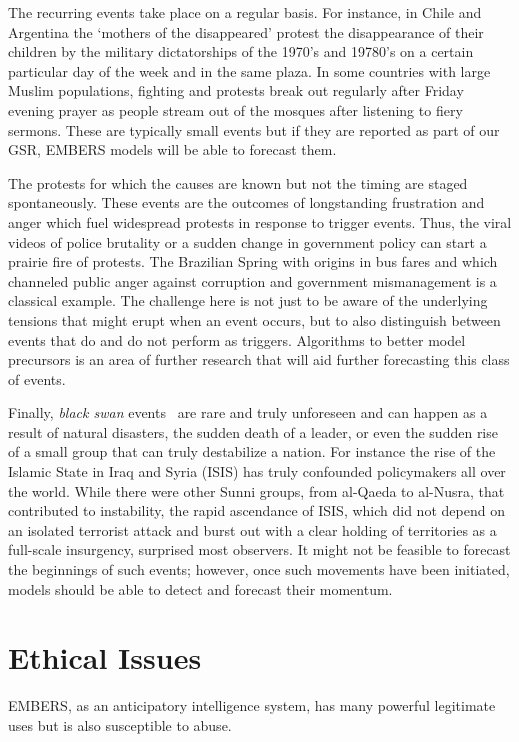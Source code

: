 \documentclass[11pt,a4paper,extrafontsizes,oneside]{article}
\begin{document}
The recurring events take place on a regular basis.  For instance, in Chile and Argentina the
`mothers of the disappeared' protest the disappearance of their children by the military dictatorships
of the 1970's and 19780's on a certain particular day of the week and in the same plaza.
In some countries with large Muslim populations, fighting and protests break out regularly after
Friday evening prayer as people stream out of the mosques after listening
to fiery sermons. These are typically small events but if they are reported as part of our GSR,
EMBERS models will be able to forecast them.

The protests for which the causes are known but not the timing are staged spontaneously.  These
events are the outcomes of longstanding frustration and anger which fuel widespread
protests in response to trigger events.  Thus, the viral videos of police brutality or
a sudden change in government policy can start a prairie fire of protests.  The Brazilian
Spring with origins in bus fares and which channeled
public anger against corruption and government mismanagement is a classical example. The challenge here
is not just to be aware of the underlying tensions that might erupt when an event occurs, but to also
distinguish between events that do and do not perform as triggers. Algorithms to better model
precursors is an area of further research that will aid further forecasting this class of events.

Finally, {\it black swan} events~\cite{taleb-book} are rare and truly unforeseen and can happen as a
result of natural disasters, the sudden death of a leader, or even the sudden rise of a
small group that can truly destabilize a nation.  For instance the rise of the
Islamic State in Iraq and Syria (ISIS) has truly confounded policymakers all over the world.
While there were other Sunni groups, from al-Qaeda to al-Nusra, that contributed to
instability, the rapid ascendance of ISIS, which did not depend on an isolated terrorist attack and
burst out with a clear holding of territories as a full-scale insurgency, surprised most observers.
It might not be feasible to forecast the beginnings of such events; however, once such movements
have been initiated, models should be able to detect and forecast their momentum.
\section{Ethical Issues}
\label{sec:ethics}
EMBERS, as an anticipatory intelligence system, has many powerful legitimate uses but is also
susceptible to abuse.
\end{document}
